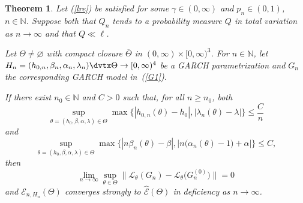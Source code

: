\documentclass[number,citesort,seceqn,dvips]{arxbj}
\newcommand{\eqref}[1]{(\ref{#1})}
\newtheorem{theorem}{Theorem}[section]
\newcommand{\NN}{\mathbb{N}}
\newcommand{\EEE}{{\mathcal E}}
\newcommand{\LLL}{{\mathcal L}}
\begin{document}
\begin{theorem}\label{th2a} Let \eqref{lre}
be satisfied for some $\gamma\in(0,\infty)$ and $p_n\in(0,1)$,
$n\in\NN$. Suppose both that $Q_n$ tends to a probability measure $Q$
in total variation as $n\to\infty$ and that $Q\ll\ell$.

Let $\Theta\neq\varnothing$ with compact closure $\overline{\Theta}$ in
$(0,\infty)\times[0,\infty)^3$. For $n\in\NN$, let
$H_n=(h_{0,n},\beta_n,\alpha_n,\break\lambda_n)\dvtx\Theta\to[0,\infty)^4$
be a
GARCH parametrization and $G_n$ the corresponding GARCH model in~\eqref{G1}.

If there exist $n_0\in\NN$ and $C>0$ such that, for all $n\ge n_0$,
both
%
\begin{equation}\label{repunifbounded1}
\sup_{\theta=(h_0,\beta,\alpha,\lambda)
\in\Theta}\max \{ |h_{0,n}(\theta) - h_0 | ,
 |\lambda_{n}(\theta) - \lambda | \}\le\frac C n
\end{equation}
%
and
%
\begin{equation}\label{repunifbounded2}
\sup_{\theta=(h_0,\beta,\alpha,\lambda)
\in\Theta}\max \bigl\{ |n\beta_{n}(\theta) - \beta |,
\bigl|n\bigl(\alpha_n(\theta) - 1\bigr)+\alpha \bigr| \bigr\}\le C ,
\end{equation}
%
then
%
\begin{equation}\label{th2astronger}
\lim_{n\to\infty}\sup_{\theta
\in\Theta} \bigl\|
\LLL_{\theta}(G_n)-\LLL_{\theta}\bigl(G_n^{(0)}\bigr)  \bigr\|=0
\end{equation}
%
and $\EEE_{n,H_n}(\Theta)$ converges strongly to $\widehat
\EEE(\Theta)$ in deficiency as $n\to\infty$.
\end{theorem}
%
\end{document}
